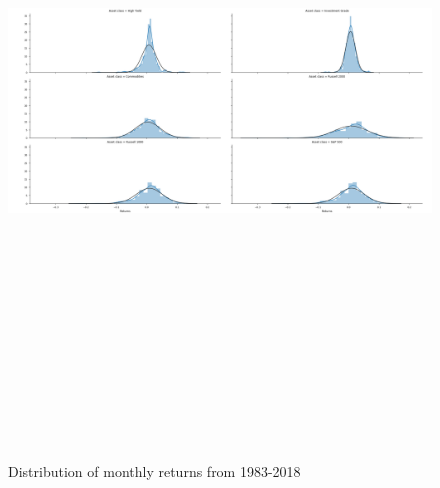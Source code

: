\documentclass[11pt,a4paper,oneside]{article}
\begin{document}
\begin{figure}[ht]
\center
\caption{Distribution of monthly returns from 1983-2018}
\vspace{-0mm}
\label{returns_dist}
\includegraphics[width=\textwidth,height=500pt]{images/return_distributions.png}
\begingroup
\vspace{-14mm}
\endgroup
\end{figure}

\clearpage
\end{document}
